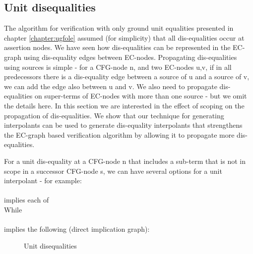 \subsection*{Unit disequalities}
The algorithm for verification with only ground unit equalities presented in chapter \ref{chapter:ugfole} assumed (for simplicity) that all dis-equalities occur at assertion nodes. We have seen how dis-equalities can be represented in the EC-graph using dis-equality edges between EC-nodes. Propagating dis-equalities using sources is simple - for a CFG-node n, and two EC-nodes u,v,  if in all predecessors there is a dis-equality edge between a source of u and a source of v, we can add the edge also between u and v. We also need to propagate dis-equalities on super-terms of EC-nodes with more than one source - but we omit the details here. 
In this section we are interested in the effect of scoping on the propagation of dis-equalities. 
We show that our technique for generating interpolants can be used to generate dis-equality interpolants that strengthens the EC-graph based verification algorithm by allowing it to propagate more dis-equalities.

For a unit dis-equality at a CFG-node n that includes a sub-term that is not in scope in a successor CFG-node s, we can have several options for a unit interpolant - for example:\\
 \\
implies each of \\
While \\
 \\
implies the following (direct implication graph):
\begin{figure}[H]
\caption{
Unit disequalities
}
\label{example_4.2.5}
\end{figure}

